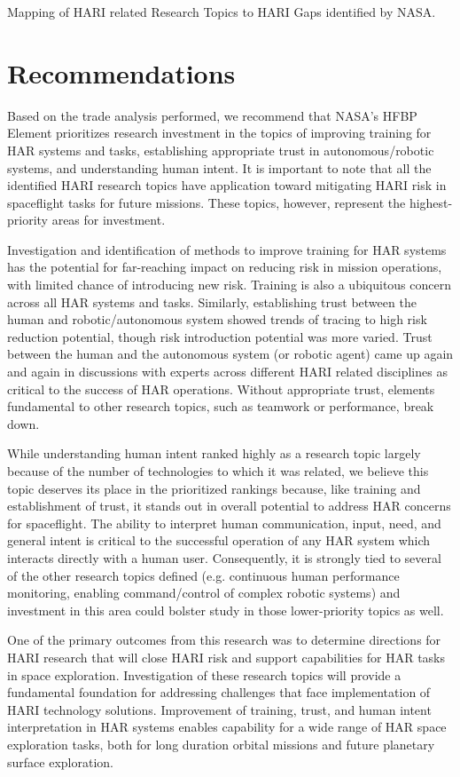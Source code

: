 \begin{table}[tb]
    \centering
    \caption[Mapping of HARI related Research Topics to HARI Gaps identified by NASA]{Mapping of HARI related Research Topics to HARI Gaps identified by NASA.}
    \label{table:hari-gaps}
\end{table}

\section{Recommendations}
Based on the trade analysis performed, we recommend that NASA's HFBP Element prioritizes research investment in the topics of improving training for HAR systems and tasks, establishing appropriate trust in autonomous/robotic systems, and understanding human intent.
It is important to note that all the identified HARI research topics have application toward mitigating HARI risk in spaceflight tasks for future missions.
These topics, however, represent the highest-priority areas for investment.

Investigation and identification of methods to improve training for HAR systems has the potential for far-reaching impact on reducing risk in mission operations, with limited chance of introducing new risk.
Training is also a ubiquitous concern across all HAR systems and tasks.
Similarly, establishing trust between the human and robotic/autonomous system showed trends of tracing to high risk reduction potential, though risk introduction potential was more varied.
Trust between the human and the autonomous system (or robotic agent) came up again and again in discussions with experts across different HARI related disciplines as critical to the success of HAR operations.
Without appropriate trust, elements fundamental to other research topics, such as teamwork or performance, break down.

While understanding human intent ranked highly as a research topic largely because of the number of technologies to which it was related, we believe this topic deserves its place in the prioritized rankings because, like training and establishment of trust, it stands out in overall potential to address HAR concerns for spaceflight.
The ability to interpret human communication, input, need, and general intent is critical to the successful operation of any HAR system which interacts directly with a human user.
Consequently, it is strongly tied to several of the other research topics defined (e.g. continuous human performance monitoring, enabling command/control of complex robotic systems) and investment in this area could bolster study in those lower-priority topics as well.

One of the primary outcomes from this research was to determine directions for HARI research that will close HARI risk and support capabilities for HAR tasks in space exploration.
Investigation of these research topics will provide a fundamental foundation for addressing challenges that face implementation of HARI technology solutions.
Improvement of training, trust, and human intent interpretation in HAR systems enables capability for a wide range of HAR space exploration tasks, both for long duration orbital missions and future planetary surface exploration.
